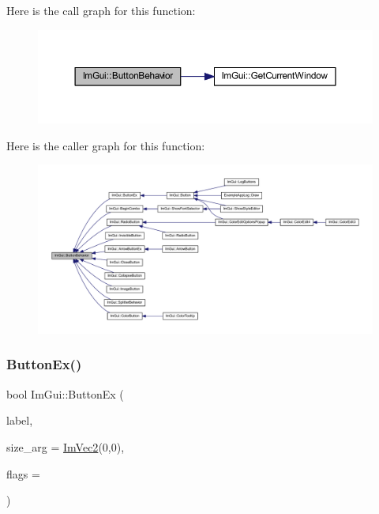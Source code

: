 Here is the call graph for this function\+:
\nopagebreak
\begin{figure}[H]
\begin{center}
\leavevmode
\includegraphics[width=350pt]{namespace_im_gui_a65a4f18b1bc8ce0f351687922089f374_cgraph}
\end{center}
\end{figure}
Here is the caller graph for this function\+:
\nopagebreak
\begin{figure}[H]
\begin{center}
\leavevmode
\includegraphics[width=350pt]{namespace_im_gui_a65a4f18b1bc8ce0f351687922089f374_icgraph}
\end{center}
\end{figure}
\mbox{\label{namespace_im_gui_ae479220c66b039874c6e4c9e9b22849f}} 
\subsubsection{\texorpdfstring{Button\+Ex()}{ButtonEx()}}
{\footnotesize\ttfamily bool Im\+Gui\+::\+Button\+Ex (\begin{DoxyParamCaption}\item[{const char $\ast$}]{label,  }\item[{const \mbox{\hyperlink{struct_im_vec2}{Im\+Vec2}} \&}]{size\+\_\+arg = {\ttfamily \mbox{\hyperlink{struct_im_vec2}{Im\+Vec2}}(0,0)},  }\item[{\mbox{\hyperlink{imgui__internal_8h_a990fae518aa1d95f571ee40989de4c22}{Im\+Gui\+Button\+Flags}}}]{flags = {} }\end{DoxyParamCaption})}

